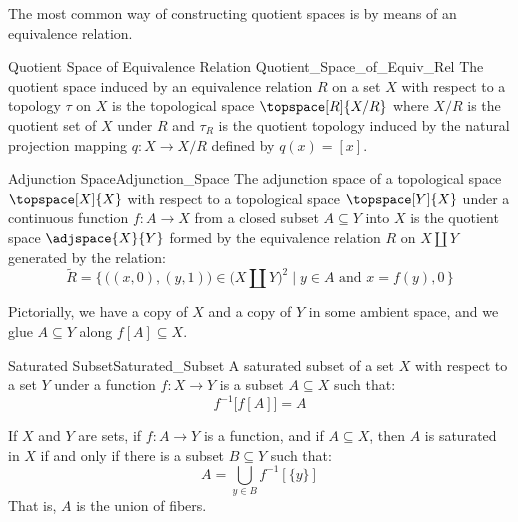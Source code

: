 \documentclass{article}                                                        %
\begin{document}
        The most common way of constructing quotient spaces is by means of an
        equivalence relation.
        \begin{fdefinition}{Quotient Space of Equivalence Relation}
                           {Quotient_Space_of_Equiv_Rel}
            The quotient space induced by an equivalence relation $R$ on a set
            $X$ with respect to a topology $\tau$ on $X$ is the topological
            space $\topspace[R]{X/R}$ where $X/R$ is the quotient set of $X$
            under $R$ and $\tau_{R}$ is the quotient topology induced by the
            natural projection mapping $q:X\rightarrow{X}/R$ defined by
            $q(x)=[x]$.
        \end{fdefinition}
        \begin{fdefinition}{Adjunction Space}{Adjunction_Space}
            The adjunction space of a topological space $\topspace[X]{X}$
            with respect to a topological space $\topspace[Y]{X}$ under a
            continuous function $f:A\rightarrow{X}$ from a closed subset
            $A\subseteq{Y}$ into $X$ is the quotient space
            $\adjspace{X}{Y}$ formed by the equivalence relation $R$ on
            $X\coprod{Y}$ generated by the relation:
            \begin{equation*}
                \tilde{R}=
                    \Big\{\,
                        \big((x,0),(y,1)\big)\in\big(X\coprod{Y}\big)^{2}\;|\;
                        y\in{A}\textrm{ and }x=f(y),0\,
                    \Big\}
            \end{equation*}
        \end{fdefinition}
        Pictorially, we have a copy of $X$ and a copy of $Y$ in some ambient
        space, and we glue $A\subseteq{Y}$ along $f[A]\subseteq{X}$.
        \begin{fdefinition}{Saturated Subset}{Saturated_Subset}
            A saturated subset of a set $X$ with respect to a set $Y$ under a
            function $f:X\rightarrow{Y}$ is a subset $A\subseteq{X}$ such that:
            \begin{equation*}
                f^{\minus{1}}\big[f[A]\big]=A
            \end{equation*}
        \end{fdefinition}
        \begin{theorem}
            If $X$ and $Y$ are sets, if $f:A\rightarrow{Y}$ is a function, and
            if $A\subseteq{X}$, then $A$ is saturated in $X$ if and only if
            there is a subset $B\subseteq{Y}$ such that:
            \begin{equation}
                A=\bigcup_{y\in{B}}f^{\minus{1}}[\{y\}]
            \end{equation}
            That is, $A$ is the union of fibers.
        \end{theorem}
\end{document}
